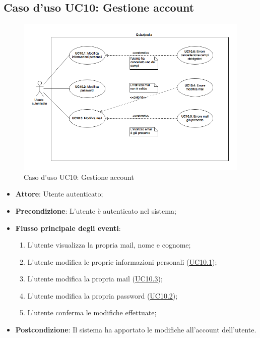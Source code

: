 \documentclass[12pt,a4paper]{article}
\begin{document}
\subsection{Caso d'uso UC10: Gestione account}
\begin{figure}[H]
    \centering
	\includegraphics[width=\textwidth]{../img/diagramUC10.png}
	\caption{Caso d'uso UC10: Gestione account}\label{fig:UC10} 
\end{figure}
\begin{itemize}

\item \textbf{Attore}: Utente autenticato; 
\item \textbf{Precondizione}: L'utente è autenticato nel sistema;

\item \textbf{Flusso principale degli eventi}:
\begin{enumerate}
	\item L’utente visualizza la propria mail, nome e cognome;
	\item L’utente modifica le proprie informazioni personali (\hyperlink{UC10.1}{UC10.1});
	\item L’utente modifica la propria mail (\hyperlink{UC10.3}{UC10.3});
	\item L’utente modifica la propria password (\hyperlink{UC10.2}{UC10.2});
	\item L'utente conferma le modifiche effettuate;
	
\end{enumerate}
\item \textbf{Postcondizione}: Il sistema ha apportato le modifiche all'account dell'utente.
\end{itemize}
\hypertarget{UC10.1}{}
\end{document}
